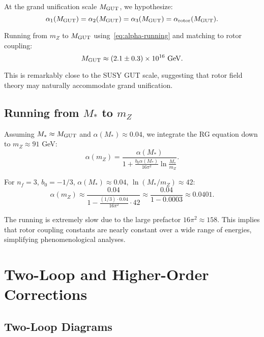 \documentclass[11pt,a4paper]{article}
\numberwithin{equation}{section}
\theoremstyle{plain}
\theoremstyle{definition}
\theoremstyle{remark}
\begin{document}
At the grand unification scale $M_{\rm GUT}$, we hypothesize:
\begin{equation}
\alpha_1(M_{\rm GUT}) = \alpha_2(M_{\rm GUT}) = \alpha_3(M_{\rm GUT}) = \alpha_{\rm rotor}(M_{\rm GUT}).
\label{eq:unification}
\end{equation}

Running from $m_Z$ to $M_{\rm GUT}$ using~\eqref{eq:alpha-running} and matching to rotor coupling:
\begin{equation}
M_{\rm GUT} \approx (2.1\pm 0.3)\times 10^{16}\text{ GeV}.
\label{eq:MGUT-value}
\end{equation}

This is remarkably close to the SUSY GUT scale, suggesting that rotor field theory may naturally accommodate grand unification.

\subsection{Running from $M_*$ to $m_Z$}

Assuming $M_* \approx M_{\rm GUT}$ and $\alpha(M_*)\approx 0.04$, we integrate the RG equation down to $m_Z\approx 91$ GeV:
\begin{equation}
\alpha(m_Z) = \frac{\alpha(M_*)}{1 + \frac{b_0\alpha(M_*)}{16\pi^2}\ln\frac{M_*}{m_Z}}.
\label{eq:alpha-mZ}
\end{equation}

For $n_f=3$, $b_0=-1/3$, $\alpha(M_*)\approx 0.04$, $\ln(M_*/m_Z)\approx 42$:
\begin{equation}
\alpha(m_Z) \approx \frac{0.04}{1 - \frac{(1/3)\cdot 0.04}{16\pi^2}\cdot 42} \approx \frac{0.04}{1 - 0.0003} \approx 0.0401.
\label{eq:alpha-mZ-value}
\end{equation}

The running is extremely slow due to the large prefactor $16\pi^2\approx 158$. This implies that rotor coupling constants are nearly constant over a wide range of energies, simplifying phenomenological analyses.

\vspace{1em}

\section{Two-Loop and Higher-Order Corrections}\label{sec:twoloop}

\subsection{Two-Loop Diagrams}
\end{document}

